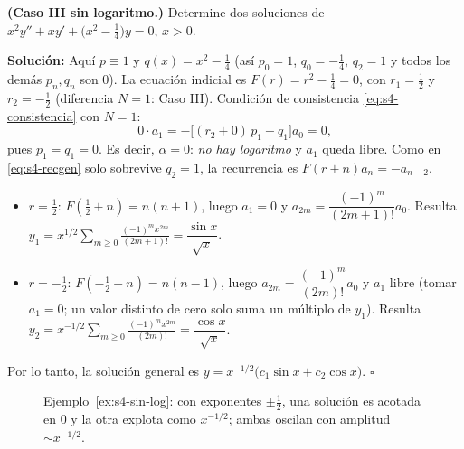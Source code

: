 \begin{example}\label{ex:s4-sin-log}
\textbf{(Caso III sin logaritmo.)} Determine dos soluciones de $x^2y''+xy'+\bigl(x^2-\tfrac14\bigr)y=0$, $x>0$.
 
\noindent \textbf{Solución:} \quad Aquí $p\equiv1$ y $q(x)=x^2-\frac14$ (así $p_0=1$, $q_0=-\tfrac14$, $q_2=1$ y todos los demás $p_n,q_n$ son $0$). La ecuación indicial es $F(r)=r^2-\tfrac14=0$, con $r_1=\tfrac12$ y $r_2=-\tfrac12$ (diferencia $N=1$: Caso III). Condición de consistencia \eqref{eq:s4-consistencia} con $N=1$:
\[ 0\cdot a_1=-\bigl[(r_2+0)\,p_1+q_1\bigr]a_0=0, \]
pues $p_1=q_1=0$. Es decir, $\alpha=0$: \emph{no hay logaritmo} y $a_1$ queda libre. Como en \eqref{eq:s4-recgen} solo sobrevive $q_2=1$, la recurrencia es $F(r+n)a_n=-a_{n-2}$.
\begin{itemize}
\item $r=\tfrac12$: $F(\tfrac12+n)=n(n+1)$, luego $a_1=0$ y $a_{2m}=\dfrac{(-1)^m}{(2m+1)!}a_0$. Resulta $y_1=x^{1/2}\sum_{m\ge0}\frac{(-1)^m x^{2m}}{(2m+1)!}=\dfrac{\sin x}{\sqrt x}$.
\item $r=-\tfrac12$: $F(-\tfrac12+n)=n(n-1)$, luego $a_{2m}=\dfrac{(-1)^m}{(2m)!}a_0$ y $a_1$ libre (tomar $a_1=0$; un valor distinto de cero solo suma un múltiplo de $y_1$). Resulta $y_2=x^{-1/2}\sum_{m\ge0}\frac{(-1)^m x^{2m}}{(2m)!}=\dfrac{\cos x}{\sqrt x}$.
\end{itemize}
Por lo tanto, la solución general es $y=x^{-1/2}\bigl(c_1\sin x+c_2\cos x\bigr)$. \hfill $\square$
\end{example}
 
\begin{figure}[H]
\centering
{}
\caption{Ejemplo~\ref{ex:s4-sin-log}: con exponentes $\pm\frac12$, una solución es acotada en $0$ y la otra explota como $x^{-1/2}$; ambas oscilan con amplitud $\sim x^{-1/2}$.}
\label{fig:s4-sin-log}
\end{figure}
 

